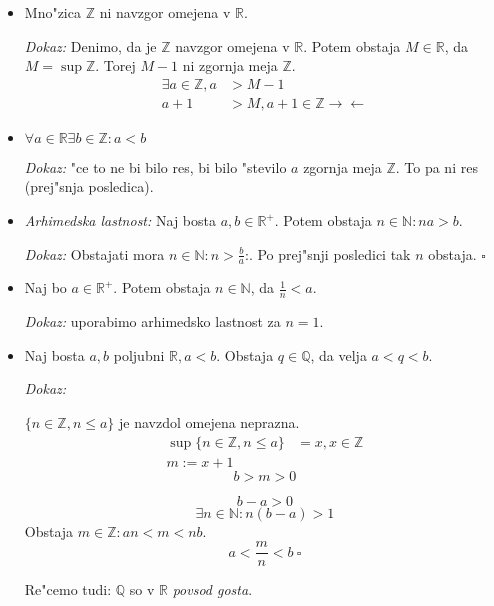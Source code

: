 \begin{itemize}
	\item Mno"zica $\mathbb{Z}$ ni navzgor omejena v $\mathbb{R}$.
	
	\emph{Dokaz:} Denimo, da je $\mathbb{Z}$ navzgor omejena v $\mathbb{R}$. Potem obstaja $M \in \mathbb{R}$, da $M = \sup \mathbb{Z}$. Torej $M - 1$ ni zgornja meja $\mathbb{Z}$.
	\begin{align*}
		\exists a \in \mathbb{Z}, a &> M-1\\
		a + 1 &> M, a + 1 \in \mathbb{Z} \rightarrow \leftarrow
	\end{align*}

	\item $\forall a \in \mathbb{R} \exists b \in \mathbb{Z}: a < b$
	
	\emph{Dokaz:} "ce to ne bi bilo res, bi bilo "stevilo $a$ zgornja meja $\mathbb{Z}$. To pa ni res (prej"snja posledica).
	
	\item \emph{Arhimedska lastnost:} Naj bosta $a, b \in \mathbb{R}^+$. Potem obstaja $n \in \mathbb{N}: na > b$.
	
	\emph{Dokaz:} Obstajati mora $n \in \mathbb{N}: n > \frac{b}{a}$:. Po prej"snji posledici tak $n$ obstaja. $\square$
	
	\item Naj bo $a \in \mathbb{R}^+$. Potem obstaja $n \in \mathbb{N}$, da $\frac{1}{n} < a$.
	
	\emph{Dokaz:} uporabimo arhimedsko lastnost za $n = 1$.
	
	\item Naj bosta $a, b$ poljubni $\mathbb{R}, a < b$. Obstaja $q \in \mathbb{Q}$, da velja $a < q < b$.
	
	\emph{Dokaz:}
	
	$\{n \in \mathbb{Z}, n \leq a\}$ je navzdol omejena neprazna.
	\begin{align*}
		\sup \{n \in \mathbb{Z}, n \leq a\} &= x, x \in \mathbb{Z}\\
		m := x + 1
	\end{align*}
	\[b > m > 0\]
	
	\[b - a > 0\]
	\[\exists n \in \mathbb{N}: n(b-a) > 1\]
	Obstaja $m \in \mathbb{Z}: an < m < nb$.
	\[a < \frac{m}{n} < b\ \square\]
	
	Re"cemo tudi: $\mathbb{Q}$ so v $\mathbb{R}$ \emph{povsod gosta}.
\end{itemize}
